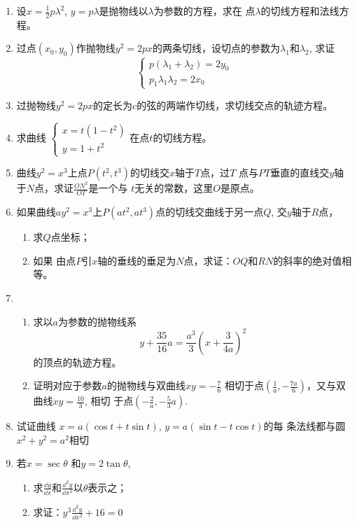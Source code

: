 \begin{ex}
\begin{enumerate}
    \item 设$x=\frac{1}{2}p\lambda^2$, $y=p\lambda$是抛物线以$\lambda$为参数的方程，求在
    点$\lambda$的切线方程和法线方程。
    \item 过点$(x_0,y_0)$作抛物线$y^2=2px$的两条切线，设切点的参数为$\lambda_1$和$\lambda_2$, 求证
    \[\begin{cases}
        p(\lambda_1+\lambda_2)=2y_0\\
        p_1\lambda_1\lambda_2=2x_0
    \end{cases}\]
    \item 过抛物线$y^2=2px$的定长为$c$的弦的两端作切线，求切线交点的轨迹方程。
    
    \item 求曲线
    $\begin{cases}
        x=t (1-t^2) \\ y=1+t^2
    \end{cases}$在点$t$的切线方程。

\item 曲线$y^2=x^3$上点$P(t^2,t^3)$的切线交$x$轴于$T$点，过$T$
点与$PT$垂直的直线交$y$轴于$N$点，求证$\frac{ON^2}{OT}$是一个与
$t$无关的常数，这里$O$是原点。
\item 如果曲线$ay^2=x^3$上$P(at^2,at^3)$点的切线交曲线于另一点$Q$, 交$y$轴于$R$点，
\begin{enumerate}
    \item 求$Q$点坐标；
    \item 如果
由点$P$引$x$轴的垂线的垂足为$N$点，求证：$OQ$和$RN$的斜率的绝对值相等。
\end{enumerate}
\item \begin{enumerate}
    \item 求以$a$为参数的抛物线系
\[y+\frac{35}{16}a=\frac{a^3}{3}\left(x+\frac{3}{4a}\right)^2\]
的顶点的轨迹方程。
\item 证明对应于参数$a$的抛物线与双曲线$xy=-\frac{7}{6}$ 
相切于点$\left(\frac{1}{a},-\frac{7a}{6}\right)$，又与双曲线$xy=\frac{10}{3}$, 相切
于点$\left(-\frac{2}{a},-\frac{5}{3}a\right)$.
\end{enumerate} 

\item 试证曲线
$x=a(\cos t+t\sin t)$, $y=a(\sin t-t\cos t)$的每
条法线都与圆$x^2+y^2=a^2$相切

\item 若$x=\sec\theta$ 和$y=2\tan\theta$,
\begin{enumerate}
    \item 求$\frac{\dd y}{\dd x}$和$\frac{\dd^2 y}{\dd x^2}$以$\theta$表示之；
\item 求证：$y^3\frac{\dd^2 y}{\dd x^2}+16=0$
\end{enumerate}


\end{enumerate}
\end{ex}
